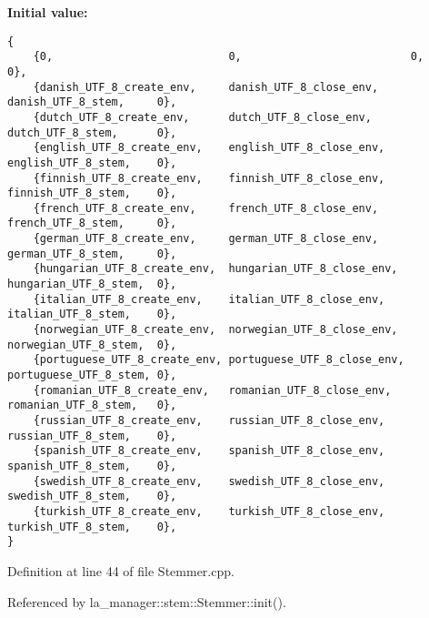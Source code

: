 \textbf{Initial value:}

\begin{Code}\begin{verbatim}
{
    {0,                           0,                          0,                     0},
    {danish_UTF_8_create_env,     danish_UTF_8_close_env,     danish_UTF_8_stem,     0},
    {dutch_UTF_8_create_env,      dutch_UTF_8_close_env,      dutch_UTF_8_stem,      0},
    {english_UTF_8_create_env,    english_UTF_8_close_env,    english_UTF_8_stem,    0},
    {finnish_UTF_8_create_env,    finnish_UTF_8_close_env,    finnish_UTF_8_stem,    0},
    {french_UTF_8_create_env,     french_UTF_8_close_env,     french_UTF_8_stem,     0},
    {german_UTF_8_create_env,     german_UTF_8_close_env,     german_UTF_8_stem,     0},
    {hungarian_UTF_8_create_env,  hungarian_UTF_8_close_env,  hungarian_UTF_8_stem,  0},
    {italian_UTF_8_create_env,    italian_UTF_8_close_env,    italian_UTF_8_stem,    0},
    {norwegian_UTF_8_create_env,  norwegian_UTF_8_close_env,  norwegian_UTF_8_stem,  0},
    {portuguese_UTF_8_create_env, portuguese_UTF_8_close_env, portuguese_UTF_8_stem, 0},
    {romanian_UTF_8_create_env,   romanian_UTF_8_close_env,   romanian_UTF_8_stem,   0},
    {russian_UTF_8_create_env,    russian_UTF_8_close_env,    russian_UTF_8_stem,    0},
    {spanish_UTF_8_create_env,    spanish_UTF_8_close_env,    spanish_UTF_8_stem,    0},
    {swedish_UTF_8_create_env,    swedish_UTF_8_close_env,    swedish_UTF_8_stem,    0},
    {turkish_UTF_8_create_env,    turkish_UTF_8_close_env,    turkish_UTF_8_stem,    0},
}
\end{verbatim}
\end{Code}


Definition at line 44 of file Stemmer.cpp.

Referenced by la\_\-manager::stem::Stemmer::init().